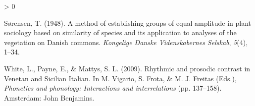 \documentclass[
  english,
  man]{apa6}
\newlength{\cslhangindent}
\newenvironment{CSLReferences}[2] %
 {%
  \setlength{\parindent}{0pt}
  \ifodd #1 \everypar{\setlength{\hangindent}{\cslhangindent}}\ignorespaces\fi
  \ifnum #2 > 0
  \setlength{\parskip}{#2\baselineskip}
  \fi
 }%
 {}
\begin{document}
\begin{CSLReferences}{1}{0}
\leavevmode\hypertarget{ref-sorensen1948}{}%
Sørensen, T. (1948). A method of establishing groups of equal amplitude in plant sociology based on similarity of species and its application to analyses of the vegetation on {D}anish commons. \emph{Kongelige Danske Videnskabernes Selskab}, \emph{5}(4), 1--34.

\leavevmode\hypertarget{ref-white2009}{}%
White, L., Payne, E., \& Mattys, S. L. (2009). Rhythmic and prosodic contrast in {V}enetan and {S}icilian {I}talian. In M. Vigario, S. Frota, \& M. J. Freitas (Eds.), \emph{Phonetics and phonology: Interactions and interrelations} (pp. 137--158). Amsterdam: John Benjamins.

\end{CSLReferences}

\endgroup
\end{document}

